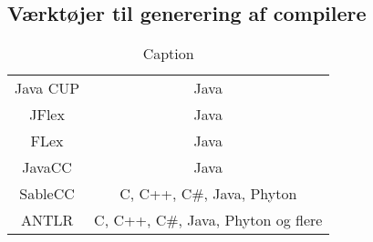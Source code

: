 \subsection{Værktøjer til generering af compilere}

\begin{table}[H]
\centering
\footnotesize
\begin{tabular}{c|c}
Java CUP& Java\\
JFlex   & Java\\
FLex    & Java\\
JavaCC  & Java\\
SableCC & C, C++, C#, Java, Phyton\\
ANTLR   & C, C++, C\#, Java, Phyton og flere\\
\end{tabular}
\caption{Caption}
\label{tab:my_label}
\end{table}
